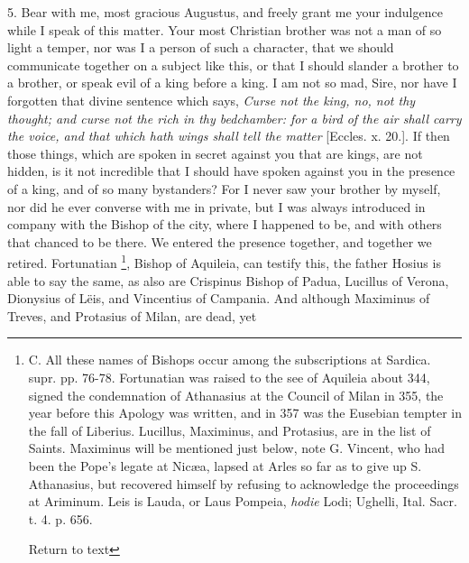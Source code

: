 5. Bear with me, most gracious Augustus, and freely grant me your
indulgence while I speak of this matter. Your most Christian brother
was not a man of so light a temper, nor was I a person of such a
character, that we should communicate together on a subject like this,
or that I should slander a brother to a brother, or speak evil of a
king before a king. I am not so mad, Sire, nor have I forgotten that
divine sentence which says, \emph{Curse
not the king, no, not thy thought; and curse not the rich in thy
bedchamber: for a bird of the air shall carry the voice, and that
which hath wings shall tell the matter} [Eccles. x. 20.]. If then those things, which are spoken in secret
against you that are kings, are not hidden, is it not incredible that
I should have spoken against you in the presence of a king, and of so
many bystanders? For I never saw your brother by myself, nor did he
ever converse with me in private, but I was always introduced in
company with the Bishop of the city, where I happened to be, and with
others that chanced to be there. We entered the presence together, and
together we retired. Fortunatian \footnote{C. All these names of Bishops occur among the subscriptions at Sardica.
supr. pp. 76-78. Fortunatian was raised to the see of Aquileia about
344, signed the condemnation of Athanasius at the Council of Milan in
355, the year before this Apology was written, and in 357 was the
Eusebian tempter in the fall of Liberius. Lucillus, Maximinus, and
Protasius, are in the list of Saints. Maximinus will be mentioned just
below, note G. Vincent, who had been the Pope's legate at Nicæa,
lapsed at Arles so far as to give up S. Athanasius, but recovered
himself by refusing to acknowledge the proceedings at Ariminum. Leis
is Lauda, or Laus Pompeia, \emph{hodie} Lodi; Ughelli, Ital. Sacr. t. 4. p. 656.

Return to text}, Bishop of Aquileia, can testify this, the father Hosius is
able to say the same, as also are Crispinus Bishop of Padua, Lucillus
of Verona, Dionysius of Lëis, and Vincentius of Campania. And
although Maximinus of Treves, and Protasius of Milan, are dead, yet
